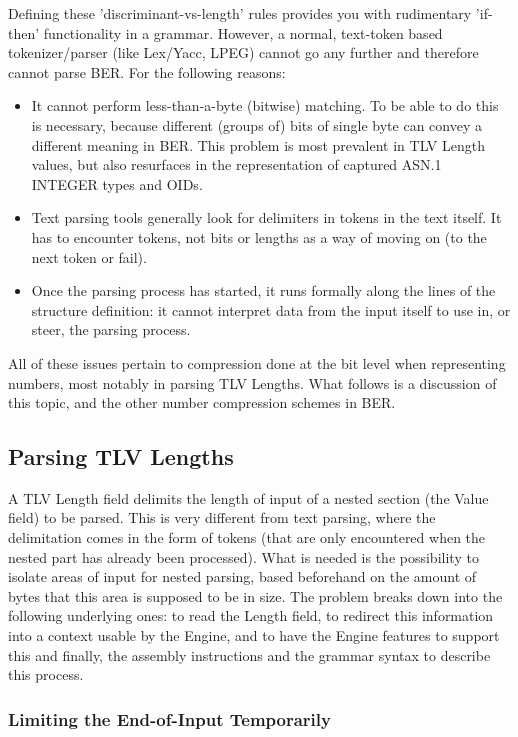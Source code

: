 Defining these 'discriminant-vs-length' rules provides you with
rudimentary 'if-then' functionality in a grammar.
However, a normal, text-token based tokenizer/parser (like Lex/Yacc, LPEG) 
cannot go any further and therefore cannot parse BER. For the following 
reasons:

\begin{itemize}
    \item It cannot perform less-than-a-byte (bitwise) matching. To be able 
to do this is necessary, because different (groups of) bits of single byte 
can convey a different meaning in BER. This problem is most prevalent in 
TLV Length values, but also resurfaces in the representation of captured 
ASN.1 INTEGER types and OIDs.
    \item Text parsing tools generally look for delimiters in tokens in the 
text itself. It has to encounter tokens, not bits or lengths as a way of 
moving on (to the next token or fail).
    \item Once the parsing process has started, it runs formally along the 
lines of the structure definition: it cannot interpret data from the input 
itself to use in, or steer, the parsing process. 
\end{itemize}

All of these issues pertain to compression done at the bit level when 
representing numbers, most notably in parsing TLV Lengths. What follows is 
a discussion of this topic, and the other number compression schemes in 
BER.

\subsection{Parsing TLV Lengths}

A TLV Length field delimits the length of input of a nested section (the 
Value field) to be parsed. This is very different from text parsing, where 
the delimitation comes in the form of tokens (that are only encountered 
when the nested part has already been processed). What is needed is the 
possibility to isolate areas of input for nested parsing, based beforehand 
on the amount of bytes that this area is supposed to be in size. The 
problem breaks down into the following underlying ones: to read the Length 
field, to redirect this information into a context usable by the Engine, 
and to have the Engine features to support this and finally, the assembly 
instructions and the grammar syntax to describe this process.

\subsubsection{Limiting the End-of-Input Temporarily}

